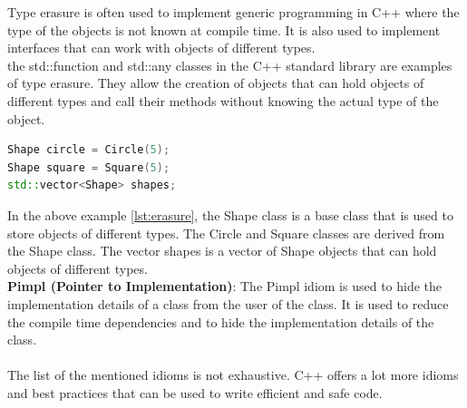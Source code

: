 \begin{spacing}{1.2}
    Type erasure is often used to implement generic programming in C++ where the type of
    the objects is not known at compile time. It is also used to implement interfaces that
    can work with objects of different types.\\

    the std::function and std::any classes in the C++ standard library are examples of type
    erasure. They allow the creation of objects that can hold objects of different types
    and call their methods without knowing the actual type of the object.\\

    \begin{lstlisting}[language=C++,caption={Example of Type Erasure},label={lst:erasure}]
Shape circle = Circle(5);
Shape square = Square(5);
std::vector<Shape> shapes;
    \end{lstlisting}

    In the above example \ref{lst:erasure}, the Shape class is a base class that is used to
    store objects of different types. The Circle and Square classes are derived from the Shape
    class. The vector shapes is a vector of Shape objects that can hold objects of different types.\\

    \textbf{Pimpl (Pointer to Implementation)}:
    The Pimpl idiom is used to hide the implementation details of a class from the user of the
    class. It is used to reduce the compile time dependencies and to hide the implementation
    details of the class.\\ \\

    The list of the mentioned idioms is not exhaustive. C++ offers a lot more idioms and best 
    practices that can be used to write efficient and safe code.











\end{spacing}
